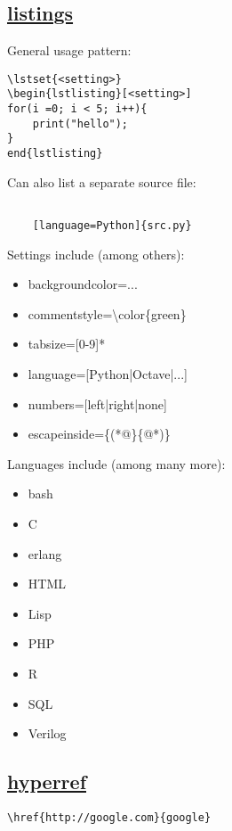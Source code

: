 \subsection*{\href{http://texdoc.net/texmf-dist/doc/latex/listings/listings.pdf}{listings}}
General usage pattern: \\
\begin{minipage}{6.0cm}
\begin{lstlisting}
\lstset{<setting>}
\begin{lstlisting}[<setting>]
for(i =0; i < 5; i++){
    print("hello");
}
end{lstlisting}
\end{lstlisting}
Can also list a separate source file: \\
\begin{lstlisting}

    [language=Python]{src.py}
\end{lstlisting}
Settings include (among others):\\
\begin{itemize}
    \item backgroundcolor=...
    \item commentstyle=\textbackslash color\{green\}
    \item tabsize=[0-9]*
    \item language=[Python|Octave|...]
    \item numbers=[left|right|none]
    \item escapeinside=\{(*@\}\{@*)\}
\end{itemize} 
Languages include (among many more): \\
\begin{multicols}{3}
\begin{itemize}
    \item bash
    \item C
    \item erlang
    \item HTML
    \item Lisp
    \item PHP
    \item R
    \item SQL
    \item Verilog
\end{itemize}
\end{multicols}
\end{minipage}

\subsection*{\href{http://mirrors.ctan.org/macros/latex/contrib/hyperref/doc/manual.pdf}{hyperref}}
\begin{minipage}{6.5cm}
\begin{lstlisting}
\href{http://google.com}{google}
\end{lstlisting}
\end{minipage}


\subsection*{}

\subsection*{}
